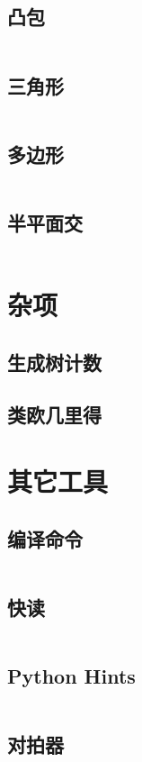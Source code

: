 \documentclass[10pt, a4paper, oneside]{ctexart}
\begin{document}
\begin{multicols}{2}
        \subsection{凸包}
        \inputminted{cpp}{src/geometry/convex.cpp}
        \subsection{三角形}
        \inputminted{cpp}{src/geometry/triangle.cpp}
        \subsection{多边形}
        \inputminted{cpp}{src/geometry/polygon.cpp}
        \subsection{半平面交}
        \inputminted{cpp}{src/geometry/half-plane.cpp}

        \section{杂项}
        \subsection{生成树计数}
        
        \subsection{类欧几里得}
        

        \section{其它工具}
        \subsection{编译命令}
        \inputminted{bash}{src/tools/compile.sh}
        \subsection{快读}
        \inputminted{cpp}{src/tools/fastio.cpp}
        \subsection{Python Hints}
        \inputminted{python3}{src/tools/python_hint.py}
        \subsection{对拍器}
        \inputminted{python3}{src/tools/llx_checker.py}

\end{multicols}
\end{document}
